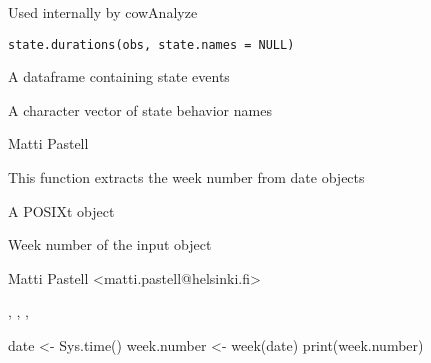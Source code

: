 \documentclass{book}
\begin{document}
\begin{Description}\relax
Used internally by cowAnalyze
\end{Description}
\begin{Usage}
\begin{verbatim}
state.durations(obs, state.names = NULL)
\end{verbatim}
\end{Usage}
\begin{Arguments}
\begin{ldescription}
\item[\code{obs}] A dataframe containing state events
\item[\code{state.names}] A character vector of state behavior names
\end{ldescription}
\end{Arguments}
\begin{Author}\relax
Matti Pastell
\end{Author}

\begin{Description}\relax
This function extracts the week number from date objects
\end{Description}
\begin{Arguments}
\begin{ldescription}
\item[\code{x}] A POSIXt object
\end{ldescription}
\end{Arguments}
\begin{Value}
\begin{ldescription}
\item[\code{week}] Week number of the input object
\end{ldescription}
\end{Value}
\begin{Author}\relax
Matti Pastell <matti.pastell@helsinki.fi>
\end{Author}
\begin{SeeAlso}\relax
{}, ,
, 
\end{SeeAlso}
\begin{Examples}
\begin{ExampleCode}
date <- Sys.time()
week.number <- week(date)
print(week.number)
\end{ExampleCode}
\end{Examples}
\end{document}

